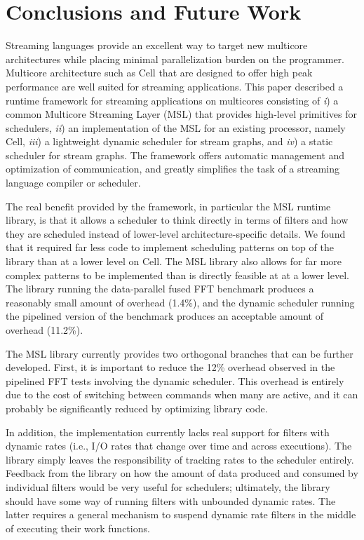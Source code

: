 \section{Conclusions and Future Work}\label{ch:conc}

Streaming languages provide an excellent way to
target new multicore architectures while placing minimal
parallelization burden on the programmer. Multicore architecture such
as Cell that are designed to offer high peak performance are well
suited for streaming applications. This paper described a runtime
framework for streaming applications on multicores consisting of
\emph{i}) a common Multicore Streaming Layer (MSL) that provides
high-level primitives for schedulers, \emph{ii}) an implementation
of the MSL for an existing processor, namely Cell, \emph{iii}) a
lightweight dynamic scheduler for stream graphs, and \emph{iv}) a
static scheduler for stream graphs. The framework offers automatic
management and optimization of communication, and greatly
simplifies the task of a streaming language compiler or scheduler.

The real benefit provided by the framework, in particular the MSL
runtime library, is that it allows a scheduler to think directly in
terms of filters and how they are scheduled instead of lower-level
architecture-specific details. We found that it required
far less code to implement scheduling patterns on top of the library
than at a lower level on Cell. The MSL library also
allows for far more complex patterns to be implemented than is
directly feasible at at a lower level. The library running the
data-parallel fused FFT benchmark produces a reasonably small amount
of overhead (1.4\%), and the dynamic scheduler running the pipelined
version of the benchmark produces an acceptable amount of overhead
(11.2\%).

The MSL library currently provides two orthogonal branches that can be
further developed. First, it is important to reduce the 12\% overhead
observed in the pipelined FFT tests involving the dynamic
scheduler. This overhead is entirely due to the cost of switching
between commands when many are active, and it can probably be significantly
reduced by optimizing library code.

In addition, the implementation currently lacks real support for
filters with dynamic rates (i.e., I/O rates that change over time and
across executions). The library simply leaves the responsibility of
tracking rates to the scheduler entirely. Feedback from the library on
how the amount of data produced and consumed by individual filters
would be very useful for schedulers; ultimately, the library should
have some way of running filters with unbounded dynamic rates. The
latter requires a general mechanism to suspend dynamic rate filters in
the middle of executing their work functions.

